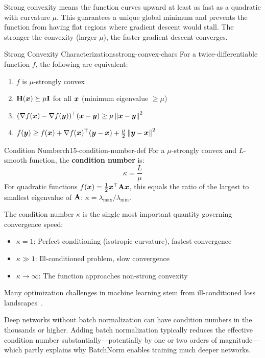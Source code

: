 \documentclass[../../main.tex]{subfiles}
\begin{document}
\begin{intuition}
Strong convexity means the function curves upward at least as fast as a quadratic with curvature $\mu$. This guarantees a unique global minimum and prevents the function from having flat regions where gradient descent would stall. The stronger the convexity (larger $\mu$), the faster gradient descent converges.
\end{intuition}

\begin{theorem}{Strong Convexity Characterizations}{strong-convex-chars}
For a twice-differentiable function $f$, the following are equivalent:
\begin{enumerate}
    \item $f$ is $\mu$-strongly convex
    \item $\mathbf{H}(\boldsymbol{x}) \succeq \mu \mathbf{I}$ for all $\boldsymbol{x}$ (minimum eigenvalue $\geq \mu$)
    \item $(\nabla f(\boldsymbol{x}) - \nabla f(\boldsymbol{y}))^\top (\boldsymbol{x} - \boldsymbol{y}) \geq \mu \left\lVert \boldsymbol{x} - \boldsymbol{y} \right\rVert^2$
    \item $f(\boldsymbol{y}) \geq f(\boldsymbol{x}) + \nabla f(\boldsymbol{x})^\top (\boldsymbol{y} - \boldsymbol{x}) + \frac{\mu}{2}\left\lVert \boldsymbol{y} - \boldsymbol{x} \right\rVert^2$
\end{enumerate}
\end{theorem}

\begin{definition}{Condition Number}{ch15-condition-number-def}
For a $\mu$-strongly convex and $L$-smooth function, the \textbf{condition number} is:
\[
    \kappa = \frac{L}{\mu}
\]
For quadratic functions $f(\boldsymbol{x}) = \frac{1}{2}\boldsymbol{x}^\top \mathbf{A} \boldsymbol{x}$, this equals the ratio of the largest to smallest eigenvalue of $\mathbf{A}$: $\kappa = \lambda_{\max}/\lambda_{\min}$.
\end{definition}

\begin{important}
The condition number $\kappa$ is the single most important quantity governing convergence speed:
\begin{itemize}
    \item $\kappa = 1$: Perfect conditioning (isotropic curvature), fastest convergence
    \item $\kappa \gg 1$: Ill-conditioned problem, slow convergence
    \item $\kappa \to \infty$: The function approaches non-strong convexity
\end{itemize}
Many optimization challenges in machine learning stem from ill-conditioned loss landscapes~\cite{goodfellow2016deep}.

Deep networks without batch normalization can have condition numbers in the thousands or higher. Adding batch normalization typically reduces the effective condition number substantially---potentially by one or two orders of magnitude---which partly explains why BatchNorm enables training much deeper networks.
\end{important}
\end{document}
